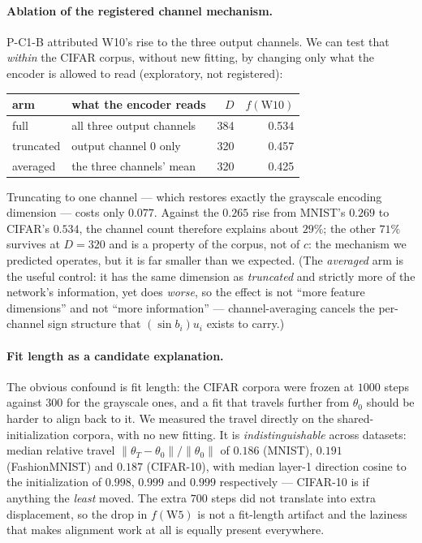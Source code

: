 \documentclass[10pt,twocolumn,letterpaper]{article}
\theoremstyle{definition}
\begin{document}
\paragraph{Ablation of the registered channel mechanism.} P-C1-B attributed W10's rise to
the three output channels. We can test that \emph{within} the CIFAR corpus, without new fitting,
by changing only what the encoder is allowed to read (exploratory, not registered):

\begin{center}\small
\begin{tabular}{@{}llrr@{}}
\toprule
arm & what the encoder reads & $D$ & $f(\mathrm{W10})$ \\
\midrule
full        & all three output channels                & 384 & 0.534 \\
truncated   & output channel 0 only                    & 320 & 0.457 \\
averaged    & the three channels' mean                 & 320 & 0.425 \\
\bottomrule
\end{tabular}
\end{center}

Truncating to one channel --- which restores exactly the grayscale encoding dimension --- costs
only $0.077$. Against the $0.265$ rise from MNIST's $0.269$ to CIFAR's $0.534$, the channel count
therefore explains about $29\%$; the other $71\%$ survives at $D = 320$ and is a property of the
corpus, not of $c$: the mechanism we predicted operates, but it is far smaller than we expected. (The \emph{averaged} arm is
the useful control: it has the same dimension as \emph{truncated} and strictly more of the
network's information, yet does \emph{worse}, so the effect is not ``more feature dimensions'' and
not ``more information'' --- channel-averaging cancels the per-channel sign structure that
$(\sin b_i)u_i$ exists to carry.)

\paragraph{Fit length as a candidate explanation.} The obvious confound is fit length: the
CIFAR corpora were frozen at $1000$ steps against $300$ for the grayscale ones, and a fit that
travels further from $\theta_0$ should be harder to align back to it. We measured the travel
directly on the shared-initialization corpora, with no new fitting. It is
\emph{indistinguishable} across datasets: median relative travel
$\|\theta_T - \theta_0\| / \|\theta_0\|$ of $0.186$ (MNIST), $0.191$ (FashionMNIST) and $0.187$
(CIFAR-10), with median layer-1 direction cosine to the initialization of $0.998$, $0.999$ and
$0.999$ respectively --- CIFAR-10 is if anything the \emph{least} moved. The extra $700$ steps did
not translate into extra displacement, so the drop in $f(\mathrm{W5})$ is not a fit-length
artifact and the laziness that makes alignment work at all is equally present everywhere.
\end{document}
